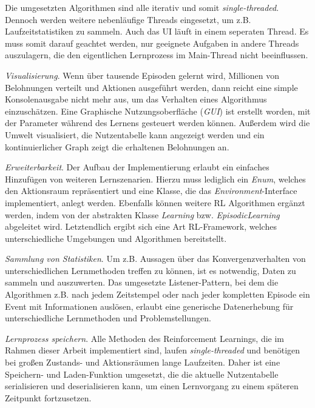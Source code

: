 Die umgesetzten Algorithmen sind alle iterativ und somit \textit{single-threaded}. Dennoch werden weitere nebenläufige Threads eingesetzt, um z.B. Laufzeitstatistiken zu sammeln. Auch das UI läuft in einem seperaten Thread. Es muss somit darauf geachtet werden, nur geeignete Aufgaben in andere Threads auszulagern, die den eigentlichen Lernprozess im Main-Thread nicht beeinflussen.
\par 
\textit{Visualisierung}. Wenn über tausende Episoden gelernt wird, Millionen von Belohnungen verteilt und Aktionen ausgeführt werden, dann reicht eine simple Konsolenausgabe nicht mehr aus, um das Verhalten eines Algorithmus einzuschätzen. Eine Graphische Nutzungsoberfläche (\textit{GUI}) ist erstellt worden, mit der Parameter während des Lernens gesteuert werden können. Außerdem wird die Umwelt visualisiert, die Nutzentabelle kann angezeigt werden und ein kontinuierlicher Graph zeigt die erhaltenen Belohnungen an.

\textit{Erweiterbarkeit}. Der Aufbau der Implementierung erlaubt ein einfaches Hinzufügen von weiteren Lernszenarien. Hierzu muss lediglich ein \textit{Enum}, welches den Aktionsraum repräsentiert und eine Klasse, die das \textit{Environment}-Interface implementiert, anlegt werden. Ebenfalls können weitere RL Algorithmen ergänzt werden, indem von der abstrakten Klasse \textit{Learning} bzw. \textit{EpisodicLearning} abgeleitet wird. Letztendlich ergibt sich eine Art RL-Framework, welches unterschiedliche Umgebungen und Algorithmen bereitstellt.

\textit{Sammlung von Statistiken}. Um z.B. Aussagen über das Konvergenzverhalten von unterschiedlichen Lernmethoden treffen zu können, ist es notwendig, Daten zu sammeln und auszuwerten. Das umgesetzte Listener-Pattern, bei dem die Algorithmen z.B. nach jedem Zeitstempel oder nach jeder kompletten Episode ein Event mit Informationen auslösen, erlaubt eine generische Datenerhebung für unterschiedliche Lernmethoden und Problemstellungen.

\textit{Lernprozess speichern}. Alle Methoden des Reinforcement Learnings, die im Rahmen dieser Arbeit implementiert sind, laufen \textit{single-threaded} und benötigen bei großen Zustands- und Aktionsräumen lange Laufzeiten. Daher ist eine Speichern- und Laden-Funktion umgesetzt, die die aktuelle Nutzentabelle serialisieren und deserialisieren kann, um einen Lernvorgang zu einem späteren Zeitpunkt fortzusetzen.

